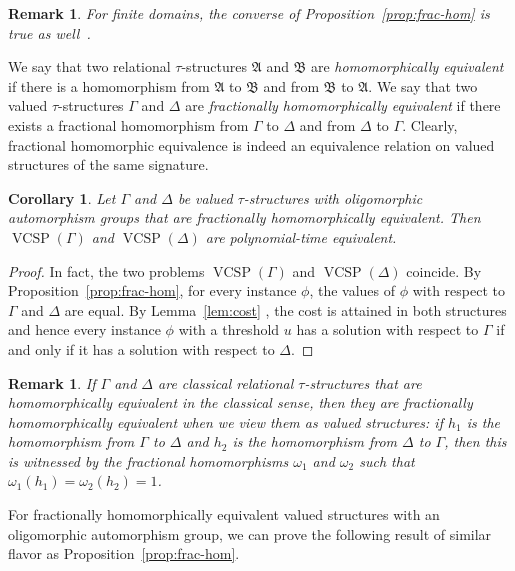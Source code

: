 \documentclass[nonacm]{acmart}
\newcommand{\bA}{{\mathfrak A}}
\newcommand{\bB}{{\mathfrak B}}
\DeclareMathOperator{\VCSP}{VCSP}
\newtheorem{corollary}[theorem]{Corollary}
\newtheorem{remark}[theorem]{Remark}
\begin{document}
\begin{remark}\label{rem:frac-hom-equiv-fin} 
For finite domains, the converse  of Proposition~\ref{prop:frac-hom} is true as well~\cite[Proposition 8.4]{Butti}. 
\end{remark}

We say that two relational $\tau$-structures $\bA$ and $\bB$ are \emph{homomorphically equivalent} if there is a homomorphism from $\bA$ to $\bB$ and from $\bB$ to $\bA$. 
We say that two valued $\tau$-structures  $\Gamma$ and $\Delta$ are \emph{fractionally homomorphically equivalent} if there exists a
fractional homomorphism from $\Gamma$ to $\Delta$ and from $\Delta$ to $\Gamma$. Clearly, fractional homomorphic equivalence is indeed an equivalence relation on valued structures of the same signature. 

\begin{corollary}\label{cor:hom-hard}
Let $\Gamma$ and $\Delta$ be valued $\tau$-structures with oligomorphic automorphism groups that are fractionally homomorphically equivalent.
Then $\VCSP(\Gamma)$ and $\VCSP(\Delta)$ are polynomial-time equivalent.  
\end{corollary}
\begin{proof}
In fact, the two problems $\VCSP(\Gamma)$ and $\VCSP(\Delta)$ coincide. By Proposition~\ref{prop:frac-hom}, for every instance $\phi$, the values of $\phi$ with respect to $\Gamma$ and $\Delta$ are equal. By Lemma~\ref{lem:cost} , the cost is attained in both structures and hence every instance $\phi$ with a threshold $u$ has a solution with respect to $\Gamma$ if and only if it has a solution with respect to $\Delta$.
\end{proof}

\begin{remark}
If $\Gamma$ and $\Delta$ are classical relational $\tau$-structures that are homomorphically equivalent in the classical sense,
then they are fractionally homomorphically equivalent when we view them 
as valued structures: if $h_1$ is the homomorphism from $\Gamma$ to $\Delta$ and $h_2$ is the homomorphism from $\Delta$ to $\Gamma$, 
then this is witnessed by the fractional homomorphisms $\omega_1$ and $\omega_2$ such that $\omega_1(h_1) = \omega_2(h_2) = 1$. 
\end{remark}

For fractionally homomorphically equivalent valued structures with an oligomorphic automorphism group, we can prove the following result of similar flavor as Proposition~\ref{prop:frac-hom}.
\end{document}
